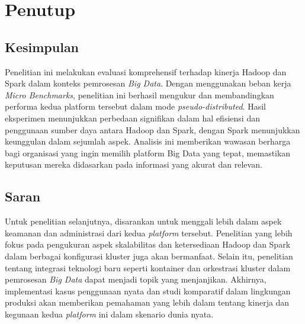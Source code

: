 \chapter{Penutup}

\section{Kesimpulan}
Penelitian ini melakukan evaluasi komprehensif terhadap kinerja Hadoop dan Spark dalam konteks pemrosesan \textit{Big Data}. Dengan menggunakan beban kerja \textit{Micro Benchmarks}, penelitian ini berhasil mengukur dan membandingkan performa kedua platform tersebut dalam mode \textit{pseudo-distributed}. Hasil eksperimen menunjukkan perbedaan signifikan dalam hal efisiensi dan penggunaan sumber daya antara Hadoop dan Spark, dengan Spark menunjukkan keunggulan dalam sejumlah aspek. Analisis ini memberikan wawasan berharga bagi organisasi yang ingin memilih platform Big Data yang tepat, memastikan keputusan mereka didasarkan pada informasi yang akurat dan relevan.

\section{Saran}
Untuk penelitian selanjutnya, disarankan untuk menggali lebih dalam aspek keamanan dan administrasi dari kedua \textit{platform} tersebut. Penelitian yang lebih fokus pada pengukuran aspek skalabilitas dan ketersediaan Hadoop dan Spark dalam berbagai konfigurasi kluster juga akan bermanfaat. Selain itu, penelitian tentang integrasi teknologi baru seperti kontainer dan orkestrasi kluster dalam pemrosesan \textit{Big Data} dapat menjadi topik yang menjanjikan. Akhirnya, implementasi kasus penggunaan nyata dan studi komparatif dalam lingkungan produksi akan memberikan pemahaman yang lebih dalam tentang kinerja dan kegunaan kedua \textit{platform} ini dalam skenario dunia nyata.